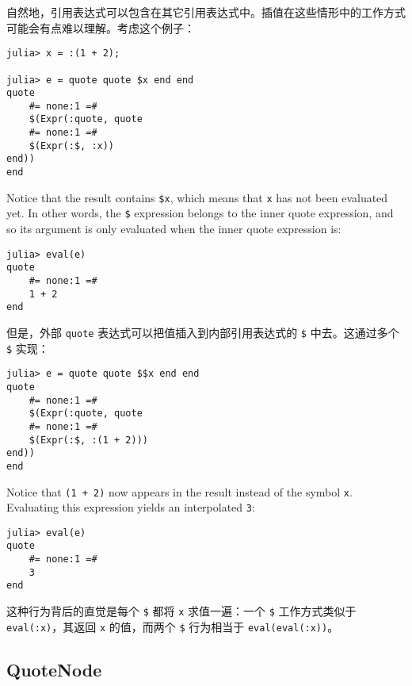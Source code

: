 自然地，引用表达式可以包含在其它引用表达式中。插值在这些情形中的工作方式可能会有点难以理解。考虑这个例子：




\begin{verbatim}
julia> x = :(1 + 2);

julia> e = quote quote $x end end
quote
    #= none:1 =#
    $(Expr(:quote, quote
    #= none:1 =#
    $(Expr(:$, :x))
end))
end
\end{verbatim}



Notice that the result contains \texttt{\$x}, which means that \texttt{x} has not been evaluated yet. In other words, the \texttt{\$} expression {\textquotedbl}belongs to{\textquotedbl} the inner quote expression, and so its argument is only evaluated when the inner quote expression is:




\begin{verbatim}
julia> eval(e)
quote
    #= none:1 =#
    1 + 2
end
\end{verbatim}



但是，外部 \texttt{quote} 表达式可以把值插入到内部引用表达式的 \texttt{\$} 中去。这通过多个 \texttt{\$} 实现：




\begin{verbatim}
julia> e = quote quote $$x end end
quote
    #= none:1 =#
    $(Expr(:quote, quote
    #= none:1 =#
    $(Expr(:$, :(1 + 2)))
end))
end
\end{verbatim}



Notice that \texttt{(1 + 2)} now appears in the result instead of the symbol \texttt{x}. Evaluating this expression yields an interpolated \texttt{3}:




\begin{verbatim}
julia> eval(e)
quote
    #= none:1 =#
    3
end
\end{verbatim}



这种行为背后的直觉是每个 \texttt{\$} 都将 \texttt{x} 求值一遍：一个 \texttt{\$} 工作方式类似于 \texttt{eval(:x)}，其返回 \texttt{x} 的值，而两个 \texttt{\$} 行为相当于 \texttt{eval(eval(:x))}。



\hypertarget{15194695339988120385}{}


\subsection{QuoteNode}



